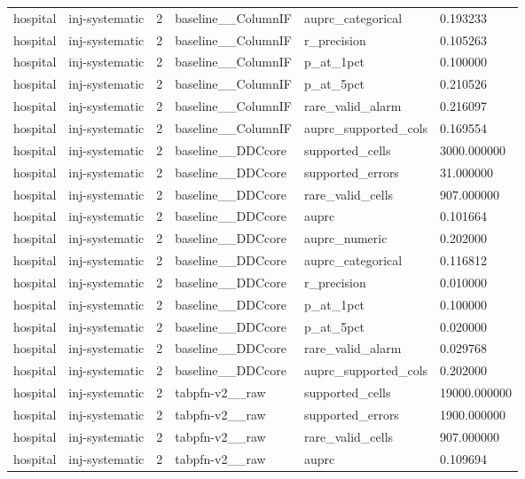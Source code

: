 \begin{tabular}{llllll}
hospital & inj-systematic & 2 & baseline\_\_ColumnIF & auprc\_categorical & 0.193233 \\
hospital & inj-systematic & 2 & baseline\_\_ColumnIF & r\_precision & 0.105263 \\
hospital & inj-systematic & 2 & baseline\_\_ColumnIF & p\_at\_1pct & 0.100000 \\
hospital & inj-systematic & 2 & baseline\_\_ColumnIF & p\_at\_5pct & 0.210526 \\
hospital & inj-systematic & 2 & baseline\_\_ColumnIF & rare\_valid\_alarm & 0.216097 \\
hospital & inj-systematic & 2 & baseline\_\_ColumnIF & auprc\_supported\_cols & 0.169554 \\
hospital & inj-systematic & 2 & baseline\_\_DDCcore & supported\_cells & 3000.000000 \\
hospital & inj-systematic & 2 & baseline\_\_DDCcore & supported\_errors & 31.000000 \\
hospital & inj-systematic & 2 & baseline\_\_DDCcore & rare\_valid\_cells & 907.000000 \\
hospital & inj-systematic & 2 & baseline\_\_DDCcore & auprc & 0.101664 \\
hospital & inj-systematic & 2 & baseline\_\_DDCcore & auprc\_numeric & 0.202000 \\
hospital & inj-systematic & 2 & baseline\_\_DDCcore & auprc\_categorical & 0.116812 \\
hospital & inj-systematic & 2 & baseline\_\_DDCcore & r\_precision & 0.010000 \\
hospital & inj-systematic & 2 & baseline\_\_DDCcore & p\_at\_1pct & 0.100000 \\
hospital & inj-systematic & 2 & baseline\_\_DDCcore & p\_at\_5pct & 0.020000 \\
hospital & inj-systematic & 2 & baseline\_\_DDCcore & rare\_valid\_alarm & 0.029768 \\
hospital & inj-systematic & 2 & baseline\_\_DDCcore & auprc\_supported\_cols & 0.202000 \\
hospital & inj-systematic & 2 & tabpfn-v2\_\_raw & supported\_cells & 19000.000000 \\
hospital & inj-systematic & 2 & tabpfn-v2\_\_raw & supported\_errors & 1900.000000 \\
hospital & inj-systematic & 2 & tabpfn-v2\_\_raw & rare\_valid\_cells & 907.000000 \\
hospital & inj-systematic & 2 & tabpfn-v2\_\_raw & auprc & 0.109694 \\

\end{tabular}
